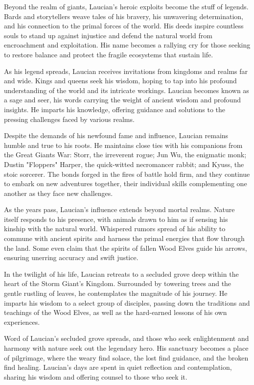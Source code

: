 \documentclass[letterpaper,openany,oneside,twocolumn]{book}
\begin{document}
Beyond the realm of giants, Laucian's heroic exploits become the stuff of legends. Bards and storytellers weave tales of his bravery, his unwavering determination, and his connection to the primal forces of the world. His deeds inspire countless souls to stand up against injustice and defend the natural world from encroachment and exploitation. His name becomes a rallying cry for those seeking to restore balance and protect the fragile ecosystems that sustain life.

As his legend spreads, Laucian receives invitations from kingdoms and realms far and wide. Kings and queens seek his wisdom, hoping to tap into his profound understanding of the world and its intricate workings. Laucian becomes known as a sage and seer, his words carrying the weight of ancient wisdom and profound insights. He imparts his knowledge, offering guidance and solutions to the pressing challenges faced by various realms.

Despite the demands of his newfound fame and influence, Laucian remains humble and true to his roots. He maintains close ties with his companions from the Great Giants War: Storr, the irreverent rogue; Jun Wu, the enigmatic monk; Dustin "Floppers" Harper, the quick-witted necromancer rabbit; and Kyuss, the stoic sorcerer. The bonds forged in the fires of battle hold firm, and they continue to embark on new adventures together, their individual skills complementing one another as they face new challenges.

As the years pass, Laucian's influence extends beyond mortal realms. Nature itself responds to his presence, with animals drawn to him as if sensing his kinship with the natural world. Whispered rumors spread of his ability to commune with ancient spirits and harness the primal energies that flow through the land. Some even claim that the spirits of fallen Wood Elves guide his arrows, ensuring unerring accuracy and swift justice.

In the twilight of his life, Laucian retreats to a secluded grove deep within the heart of the Storm Giant's Kingdom. Surrounded by towering trees and the gentle rustling of leaves, he contemplates the magnitude of his journey. He imparts his wisdom to a select group of disciples, passing down the traditions and teachings of the Wood Elves, as well as the hard-earned lessons of his own experiences.

Word of Laucian's secluded grove spreads, and those who seek enlightenment and harmony with nature seek out the legendary hero. His sanctuary becomes a place of pilgrimage, where the weary find solace, the lost find guidance, and the broken find healing. Laucian's days are spent in quiet reflection and contemplation, sharing his wisdom and offering counsel to those who seek it.
\end{document}
